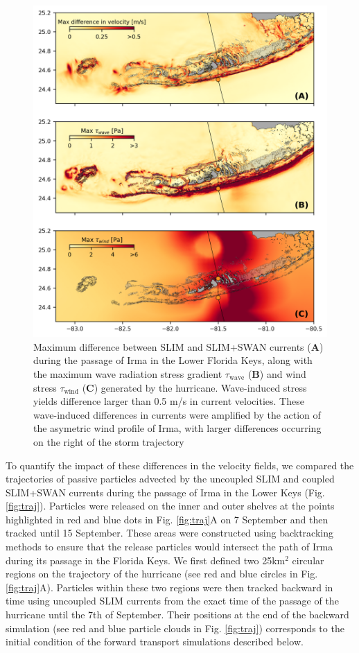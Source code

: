 \documentclass[preprint,12pt,authoryear]{elsarticle}
\begin{document}
\begin{figure}
    \centering
    \includegraphics[width=\textwidth]{fig/max_diff_reefs.png}
    \caption{Maximum difference between SLIM and SLIM+SWAN currents (\textbf{A}) during the passage of Irma in the Lower Florida Keys, along with the maximum wave radiation stress gradient {\boldmath$\tau$}$_\text{wave}$ (\textbf{B}) and wind stress {\boldmath$\tau$}$_\text{wind}$ (\textbf{C}) generated by the hurricane. Wave-induced stress yields difference larger than 0.5 m/s in current velocities. These wave-induced differences in currents were amplified by the action of the asymetric wind profile of Irma, with larger differences occurring on the right of the storm trajectory}
    \label{fig:diff}
\end{figure}

To quantify the impact of these differences in the velocity fields, we compared the trajectories of passive particles advected by the uncoupled SLIM and coupled SLIM+SWAN currents during the passage of Irma in the Lower Keys (Fig. \ref{fig:traj}). Particles were released on the inner and outer shelves at the points highlighted in red and blue dots in Fig. \ref{fig:traj}A on 7 September and then tracked until 15 September. These areas were constructed using backtracking methods \citep{dobbelaerereport} to ensure that the release particles would intersect the path of Irma during its passage in the Florida Keys. We first defined two 25km$^\text{2}$ circular regions on the trajectory of the hurricane (see red and blue circles in Fig. \ref{fig:traj}A). Particles within these two regions were then tracked backward in time using uncoupled SLIM currents from the exact time of the passage of the hurricane until the 7th of September. Their positions at the end of the backward simulation (see red and blue particle clouds in Fig. \ref{fig:traj}) corresponds to the initial condition of the forward transport simulations described below. 
\end{document}
